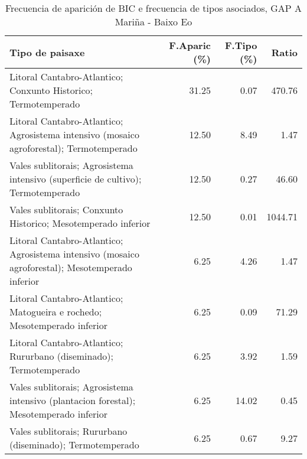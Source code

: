 \begin{table}[p]
\centering
\caption{Frecuencia de aparición de BIC e frecuencia de tipos asociados, GAP A Mariña - Baixo Eo} 
\label{vbic2}
\begin{tabular}{lrrr}
  \hline
Tipo de paisaxe & F.Aparic (\%) & F.Tipo (\%) & Ratio \\ 
  \hline
Litoral Cantabro-Atlantico; Conxunto Historico; Termotemperado & 31.25 & 0.07 & 470.76 \\ 
  Litoral Cantabro-Atlantico; Agrosistema intensivo (mosaico agroforestal); Termotemperado & 12.50 & 8.49 & 1.47 \\ 
  Vales sublitorais; Agrosistema intensivo (superficie de cultivo); Termotemperado & 12.50 & 0.27 & 46.60 \\ 
  Vales sublitorais; Conxunto Historico; Mesotemperado inferior & 12.50 & 0.01 & 1044.71 \\ 
  Litoral Cantabro-Atlantico; Agrosistema intensivo (mosaico agroforestal); Mesotemperado inferior & 6.25 & 4.26 & 1.47 \\ 
  Litoral Cantabro-Atlantico; Matogueira e rochedo; Mesotemperado inferior & 6.25 & 0.09 & 71.29 \\ 
  Litoral Cantabro-Atlantico; Rururbano (diseminado); Termotemperado & 6.25 & 3.92 & 1.59 \\ 
  Vales sublitorais; Agrosistema intensivo (plantacion forestal); Mesotemperado inferior & 6.25 & 14.02 & 0.45 \\ 
  Vales sublitorais; Rururbano (diseminado); Termotemperado & 6.25 & 0.67 & 9.27 \\ 
   \hline
\end{tabular}
\end{table}

